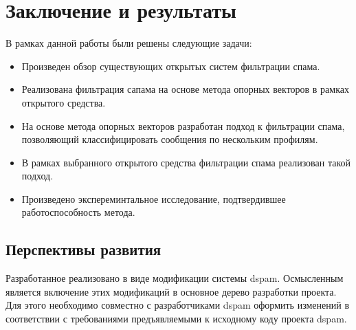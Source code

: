 \newpage
\section{Заключение и результаты}


В рамках данной	работы были решены следующие задачи:
\begin{itemize}
\item Произведен обзор существующих открытых систем фильтрации спама.
\item Реализована фильтрация сапама на основе метода опорных векторов в рамках открытого средства.
\item На основе метода опорных векторов разработан подход к фильтрации спама, позволяющий классифицировать сообщения по нескольким профилям.
\item В рамках выбранного открытого средства фильтрации спама реализован такой подход.
\item Произведено экспереминтальное исследование, подтвердившее работоспособность метода.
\end{itemize}

\subsection{Перспективы развития}

Разработанное реализовано в виде модификации системы dspam. Осмысленным является включение этих модификаций в основное дерево разработки проекта. Для этого необходимо совместно с разработчиками dspam оформить изменений в соответствии с требованиями предъявляемыми к исходному коду проекта dspam. 
